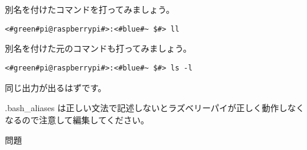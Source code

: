 別名を付けたコマンドを打ってみましょう。
\begin{lstlisting}[caption=別名の確認, label=confirmAlias]
    <#green#pi@raspberrypi#>:<#blue#~ $#> ll
\end{lstlisting}

別名を付けた元のコマンドも打ってみましょう。
\begin{lstlisting}[caption=元のコマンドの確認, label=confirmCommand]
    <#green#pi@raspberrypi#>:<#blue#~ $#> ls -l
\end{lstlisting}

同じ出力が出るはずです。

.bash{\_}aliases は正しい文法で記述しないとラズベリーパイが正しく動作しなくなるので注意して編集してください。

問題
